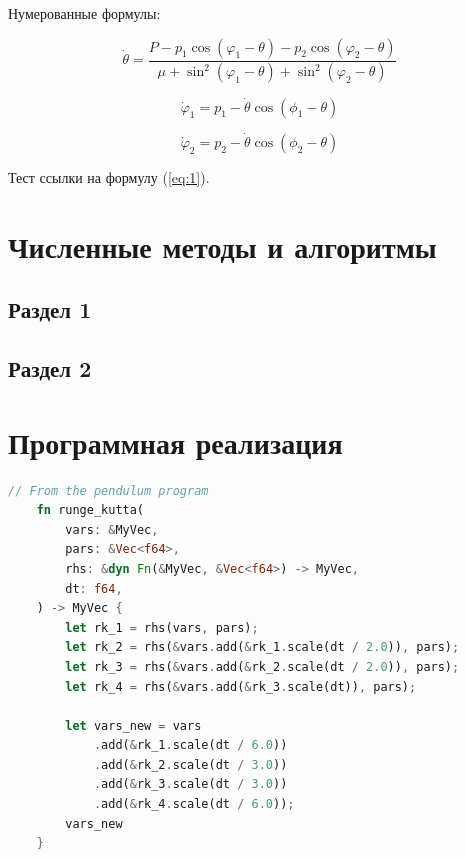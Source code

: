 \documentclass[a4paper,14pt]{extarticle}
\begin{document}
Нумерованные формулы:

\begin{equation}
    \label{eq:1}
    \dot{\theta}=\frac{P-p_{1}\cos\left(\varphi_{1}-\theta\right)-p_{2}\cos\left(\varphi_{2}-\theta\right)}{\mu+\sin^{2}\left(\varphi_{1}-\theta\right)+\sin^{2}\left(\varphi_{2}-\theta\right)}
\end{equation}

\begin{equation}
    \dot{\varphi}_{1}=p_{1}-\dot{\theta}\cos(\phi_{1}-\theta)
\end{equation}

\begin{equation}
    \dot{\varphi}_{2}=p_{2}-\dot{\theta}\cos(\phi_{2}-\theta)
\end{equation}

Тест ссылки на формулу (\ref{eq:1}).

\pagebreak
\section{Численные методы и алгоритмы}

\subsection{Раздел 1}

\subsection{Раздел 2}

\pagebreak
\section{Программная реализация}

\begin{lstlisting}[language=rust,caption={Программная реализация метода Рунге-Кутты},label={listing-1}]
    // From the pendulum program
    fn runge_kutta(
        vars: &MyVec,
        pars: &Vec<f64>,
        rhs: &dyn Fn(&MyVec, &Vec<f64>) -> MyVec,
        dt: f64,
    ) -> MyVec {
        let rk_1 = rhs(vars, pars);
        let rk_2 = rhs(&vars.add(&rk_1.scale(dt / 2.0)), pars);
        let rk_3 = rhs(&vars.add(&rk_2.scale(dt / 2.0)), pars);
        let rk_4 = rhs(&vars.add(&rk_3.scale(dt)), pars);
    
        let vars_new = vars
            .add(&rk_1.scale(dt / 6.0))
            .add(&rk_2.scale(dt / 3.0))
            .add(&rk_3.scale(dt / 3.0))
            .add(&rk_4.scale(dt / 6.0));
        vars_new
    }
    \end{lstlisting}
\end{document}
